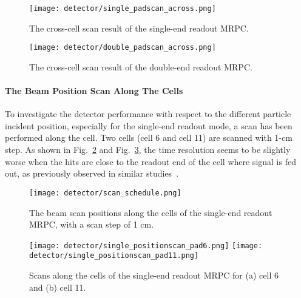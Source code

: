 \begin{figure}[htbp]
\begin{minipage}[htbp]{0.49\linewidth}
\centering
\texttt{[image: detector/single\_padscan\_across.png]}
\caption{The cross-cell scan result of the single-end readout MRPC. \label{single_end_padscan_across}}
\end{minipage}
\hfill
\begin{minipage}[htbp]{0.49\linewidth}
\centering
\texttt{[image: detector/double\_padscan\_across.png]} 
\caption{The cross-cell scan result of the double-end readout MRPC.\label{double_end_padscan_across}}
\end{minipage}
\end{figure}

\paragraph{The Beam Position Scan Along The Cells}
To investigate the detector performance with respect to the different particle incident position, especially for the single-end readout mode, a scan has been performed along the cell. Two cells (cell 6 and cell 11) are scanned with 1-cm step. As shown in Fig.~\ref{scanSchedule} and Fig.~\ref{positionScanAlong}, the time resolution seems to be slightly worse when the hits are close to the readout end of the cell where signal is fed out, as previously observed in similar studies~\cite{positionDep}.

\begin{figure}[htbp]
\begin{center}
\texttt{[image: detector/scan\_schedule.png]}
\vspace*{-3mm}
\caption{The beam scan positions along the cells of the single-end readout MRPC, with a scan step of 1 cm.} \label{scanSchedule}
\end{center}
\end{figure}

\begin{figure}[htbp]
\begin{center}
\texttt{[image: detector/single\_positionscan\_pad6.png]}
\texttt{[image: detector/single\_positionscan\_pad11.png]}
\vspace*{-3mm}
\caption{Scans along the cells of the single-end readout MRPC for (a) cell 6 and (b) cell 11.} \label{positionScanAlong}
\end{center}
\end{figure}

